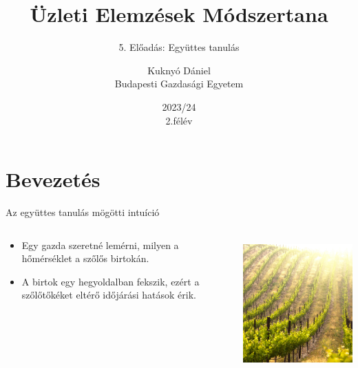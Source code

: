 \documentclass[english, aspectratio=169]{beamer}
\makeatletter
\newcommand\makebeamertitle{\frame{\maketitle}}
\let\origtableofcontents=\tableofcontents
\def\tableofcontents{\@ifnextchar[{\origtableofcontents}{\gobbletableofcontents}}
\def\gobbletableofcontents#1{\origtableofcontents}
\makeatother
\begin{document}
\section{Bevezetés}
\title[]{Üzleti Elemzések Módszertana}
\subtitle{5. Előadás: Együttes tanulás}
\author[Kuknyó Dániel]{Kuknyó Dániel\\Budapesti Gazdasági Egyetem}
\date{2023/24\\2.félév}
\makebeamertitle

\begin{frame}
\tableofcontents{}
\end{frame}

\begin{frame}
\tableofcontents[currentsection]
\end{frame}

\begin{frame}{Az együttes tanulás mögötti intuíció}
\begin{columns}
\begin{column}{.5\textwidth}
\begin{itemize}
	\item Egy gazda szeretné lemérni, milyen a hőmérséklet a szőlős birtokán. 
	\item A birtok egy hegyoldalban fekszik, ezért a szőlőtőkéket eltérő időjárási hatások érik.
\end{itemize}
\end{column}
\begin{column}{.5\textwidth}
\begin{center}
\includegraphics[width=7cm, height=5cm, keepaspectratio]{images/ensemble_2.png}
\end{center}
\end{column}
\end{columns}
\end{frame}
\end{document}
